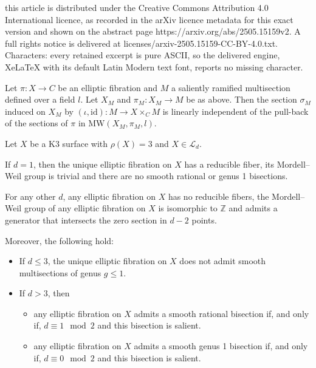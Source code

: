 \documentclass[10pt,a4paper]{amsart}
\newcommand{\MW}{\mbox{MW}}
\newcommand{\Z}{\mathbb{Z}}
\begin{document}
this article is distributed under the Creative Commons Attribution 4.0 International licence, as recorded in the arXiv licence metadata for this exact version and shown on the abstract page https://arxiv.org/abs/2505.15159v2. A full rights notice is delivered at licenses/arxiv-2505.15159-CC-BY-4.0.txt. Characters: every retained excerpt is pure ASCII, so the delivered engine, XeLaTeX with its default Latin Modern text font, reports no missing character.
\begin{lemma}\label{lem:indep_multisections}
Let $\pi:X \rightarrow C$ be an elliptic fibration and $M$ a saliently ramified multisection defined over a field $l$. Let $X_M$ and $\pi_M: X_M \rightarrow M$ be as above. Then the section $\sigma_M$ induced on $X_M$ by $(\iota, \mathrm{id}):M \rightarrow X \times_C M$ is linearly independent of the pull-back of the sections of $\pi$ in $\MW(X_M,\pi_M,l)$.
\end{lemma} 

\begin{theorem}\label{theorem:Picard3}
Let $X$ be a K3 surface with $\rho(X)=3$ and $X\in\mathcal{L}_d$. 

If $d=1$, then the unique elliptic fibration on $X$ has a reducible fiber, its Mordell--Weil group is trivial and there are no smooth rational or genus 1 bisections. 

For any other $d$, any elliptic fibration on $X$ has no reducible fibers, the Mordell--Weil group of any elliptic fibration on $X$ is isomorphic to $\Z$ and admits a generator that intersects the zero section in $d-2$ points. 

Moreover, the following hold:

\begin{itemize}
\item[a)] If $d\leq 3$, the unique elliptic fibration on $X$ does not admit smooth multisections of genus $g\leq 1$.

\item[b)] If $d>3$, then
\begin{itemize}
\item
any elliptic fibration on $X$ admits a smooth rational bisection if, and only if, $d\equiv 1\mod 2$ and this bisection is salient. 
\item any elliptic fibration on $X$ admits a smooth genus 1 bisection if, and only if, $d\equiv 0 \mod 2$ and this bisection is salient. 
\end{itemize}
\end{itemize}
\end{theorem}
\end{document}
